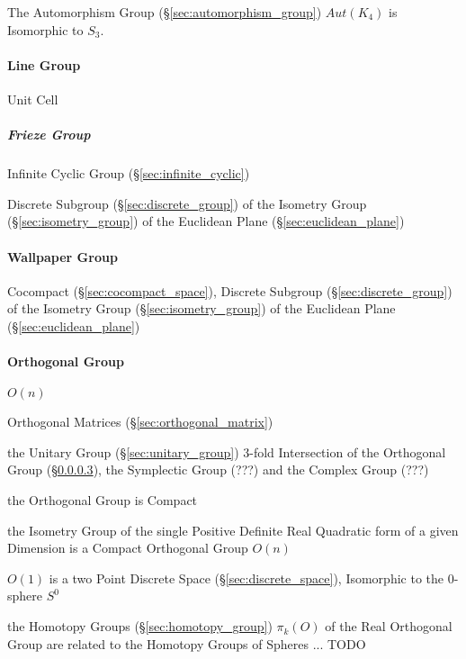 The Automorphism Group (\S\ref{sec:automorphism_group}) $Aut(K_4)$ is
Isomorphic to $S_3$.



\paragraph{Line Group}\label{sec:line_group}\hfill

Unit Cell



\subparagraph{Frieze Group}\label{sec:frieze_group}\hfill

Infinite Cyclic Group (\S\ref{sec:infinite_cyclic})

Discrete Subgroup (\S\ref{sec:discrete_group}) of the Isometry Group
(\S\ref{sec:isometry_group}) of the Euclidean Plane
(\S\ref{sec:euclidean_plane})



\paragraph{Wallpaper Group}\label{sec:wallpaper_group}\hfill

Cocompact (\S\ref{sec:cocompact_space}), Discrete Subgroup
(\S\ref{sec:discrete_group}) of the Isometry Group (\S\ref{sec:isometry_group})
of the Euclidean Plane (\S\ref{sec:euclidean_plane})



\paragraph{Orthogonal Group}\label{sec:orthogonal_group}\hfill

$O(n)$

Orthogonal Matrices (\S\ref{sec:orthogonal_matrix})

the Unitary Group (\S\ref{sec:unitary_group}) 3-fold Intersection of the
Orthogonal Group (\S\ref{sec:orthogonal_group}), the Symplectic Group (???) and
the Complex Group (???) %

the Orthogonal Group is Compact

the Isometry Group of the single Positive Definite Real Quadratic form of a
given Dimension is a Compact Orthogonal Group $O(n)$

$O(1)$ is a two Point Discrete Space (\S\ref{sec:discrete_space}), Isomorphic
to the $0$-sphere $S^0$

the Homotopy Groups (\S\ref{sec:homotopy_group}) $\pi_k(O)$ of the Real
Orthogonal Group are related to the Homotopy Groups of Spheres
... TODO



